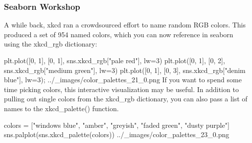 \begin{frame}[fragile]
	\frametitle{Seaborn Workshop}
	\large
A while back, xkcd ran a crowdsourced effort to name random RGB colors. This produced a set of 954 named colors, which you can now reference in seaborn using the xkcd_rgb dictionary:

plt.plot([0, 1], [0, 1], sns.xkcd_rgb["pale red"], lw=3)
plt.plot([0, 1], [0, 2], sns.xkcd_rgb["medium green"], lw=3)
plt.plot([0, 1], [0, 3], sns.xkcd_rgb["denim blue"], lw=3);
../_images/color_palettes_21_0.png
If you want to spend some time picking colors, this interactive visualization may be useful. In addition to pulling out single colors from the xkcd_rgb dictionary, you can also pass a list of names to the xkcd_palette() function.

colors = ["windows blue", "amber", "greyish", "faded green", "dusty purple"]
sns.palplot(sns.xkcd_palette(colors))
../_images/color_palettes_23_0.png
\end{frame}